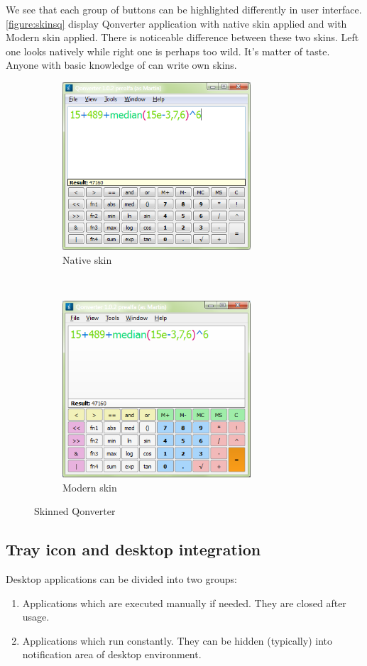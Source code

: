 We see that each group of buttons can be highlighted differently in user interface. \autoref{figure:skinsq} display Qonverter application with native skin applied and with Modern skin applied. There is noticeable difference between these two skins. Left one looks natively while right one is perhaps too wild. It's matter of taste. Anyone with basic knowledge of  can write own skins.

\begin{figure}[ht]
\centering
\begin{subfigure}[b]{0.48\textwidth}
\centering
\includegraphics[width=7cm]{graphics/real-world/00-qon-native}
\caption{Native skin}
\end{subfigure}
~
\begin{subfigure}[b]{0.48\textwidth}
\centering
\includegraphics[width=7cm]{graphics/real-world/00-qon-modern}
\caption{Modern skin}
\end{subfigure}
\caption{Skinned Qonverter}\label{figure:skinsq}
\end{figure}

\subsection{Tray icon and desktop integration}
Desktop applications can be divided into two groups:
\begin{enumerate}
\item Applications which are executed manually if needed. They are closed after usage.
\item Applications which run constantly. They can be hidden (typically) into notification area of desktop environment.
\end{enumerate}

